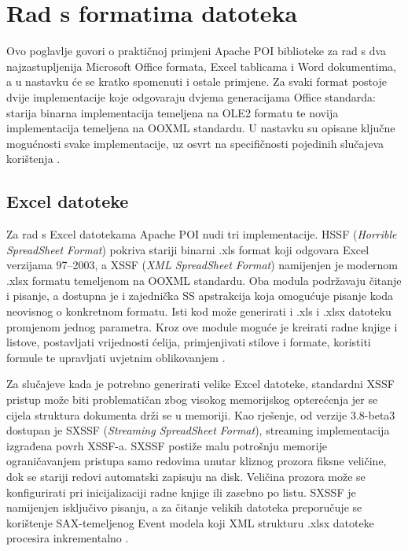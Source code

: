 \documentclass[]{foi}
\begin{document}
\chapter{Rad s formatima datoteka}

Ovo poglavlje govori o praktičnoj primjeni Apache POI biblioteke za rad s dva najzastupljenija Microsoft Office formata, Excel tablicama i Word dokumentima, a u nastavku će se kratko spomenuti i ostale primjene. Za svaki format postoje dvije implementacije koje odgovaraju dvjema generacijama Office standarda: starija binarna implementacija temeljena na OLE2 formatu te novija implementacija temeljena na OOXML standardu. U nastavku su opisane ključne mogućnosti svake implementacije, uz osvrt na specifičnosti pojedinih slučajeva korištenja \cite{apacheApachePOIComponents}.

\section{Excel datoteke}

Za rad s Excel datotekama Apache POI nudi tri implementacije. HSSF (\textit{Horrible SpreadSheet Format}) pokriva stariji binarni .xls format koji odgovara Excel verzijama 97–2003, a XSSF (\textit{XML SpreadSheet Format}) namijenjen je modernom .xlsx formatu temeljenom na OOXML standardu. Oba modula podržavaju čitanje i pisanje, a dostupna je i zajednička SS apstrakcija koja omogućuje pisanje koda neovisnog o konkretnom formatu. Isti kod može generirati i .xls i .xlsx datoteku promjenom jednog parametra. Kroz ove module moguće je kreirati radne knjige i listove, postavljati vrijednosti ćelija, primjenjivati stilove i formate, koristiti formule te upravljati uvjetnim oblikovanjem \cite{apachePOIHSSFPOIXSSFSXSSF}.

Za slučajeve kada je potrebno generirati velike Excel datoteke, standardni XSSF pristup može biti problematičan zbog visokog memorijskog opterećenja jer se cijela struktura dokumenta drži se u memoriji. Kao rješenje, od verzije 3.8-beta3 dostupan je SXSSF (\textit{Streaming SpreadSheet Format}), streaming implementacija izgrađena povrh XSSF-a. SXSSF postiže malu potrošnju memorije ograničavanjem pristupa samo redovima unutar kliznog prozora fiksne veličine, dok se stariji redovi automatski zapisuju na disk. Veličina prozora može se konfigurirati pri inicijalizaciji radne knjige ili zasebno po listu. SXSSF je  namijenjen isključivo pisanju, a za čitanje velikih datoteka preporučuje se korištenje SAX-temeljenog Event modela koji XML strukturu .xlsx datoteke procesira inkrementalno \cite{apachePOIHSSFPOIXSSFSXSSF}.
\end{document}
